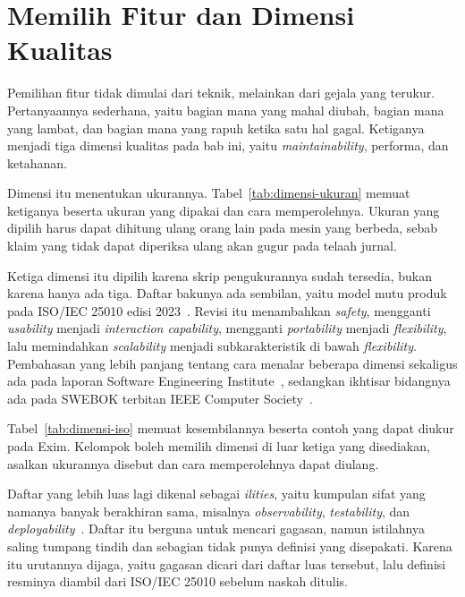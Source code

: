 \section{Memilih Fitur dan Dimensi Kualitas}

Pemilihan fitur tidak dimulai dari teknik, melainkan dari gejala yang terukur.
Pertanyaannya sederhana, yaitu bagian mana yang mahal diubah, bagian mana yang
lambat, dan bagian mana yang rapuh ketika satu hal gagal. Ketiganya menjadi
tiga dimensi kualitas pada bab ini, yaitu \textit{maintainability}, performa,
dan ketahanan.

Dimensi itu menentukan ukurannya. Tabel~\ref{tab:dimensi-ukuran} memuat
ketiganya beserta ukuran yang dipakai dan cara memperolehnya. Ukuran yang
dipilih harus dapat dihitung ulang orang lain pada mesin yang berbeda, sebab
klaim yang tidak dapat diperiksa ulang akan gugur pada telaah jurnal.

Ketiga dimensi itu dipilih karena skrip pengukurannya sudah tersedia, bukan
karena hanya ada tiga. Daftar bakunya ada sembilan, yaitu model mutu produk
pada ISO/IEC 25010 edisi 2023~\cite{iso25010}. Revisi itu menambahkan
\textit{safety}, mengganti \textit{usability} menjadi \textit{interaction
capability}, mengganti \textit{portability} menjadi \textit{flexibility}, lalu
memindahkan \textit{scalability} menjadi subkarakteristik di bawah
\textit{flexibility}. Pembahasan yang lebih panjang tentang cara menalar
beberapa dimensi sekaligus ada pada laporan Software Engineering
Institute~\cite{barbacci1995quality}, sedangkan ikhtisar bidangnya ada pada
SWEBOK terbitan IEEE Computer Society~\cite{swebok2024}.

Tabel~\ref{tab:dimensi-iso} memuat kesembilannya beserta contoh yang dapat
diukur pada Exim. Kelompok boleh memilih dimensi di luar ketiga yang
disediakan, asalkan ukurannya disebut dan cara memperolehnya dapat diulang.

Daftar yang lebih luas lagi dikenal sebagai \textit{ilities}, yaitu kumpulan
sifat yang namanya banyak berakhiran sama, misalnya \textit{observability},
\textit{testability}, dan \textit{deployability}~\cite{wikipedia2026ilities}.
Daftar itu berguna untuk mencari gagasan, namun istilahnya saling tumpang
tindih dan sebagian tidak punya definisi yang disepakati. Karena itu urutannya
dijaga, yaitu gagasan dicari dari daftar luas tersebut, lalu definisi resminya
diambil dari ISO/IEC 25010 sebelum naskah ditulis.


